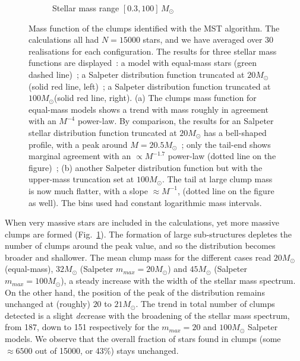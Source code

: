 \begin{figure}
\begin{subfigure}[b]{0.49\textwidth}
        \caption{Stellar mass range $[0.3, 100]\, M_\odot$}
        \label{Fig:2_ClumpMF_MF_2}
    \end{subfigure}
\caption{Mass function of the clumps identified with the MST algorithm. The calculations all had $N = 15 000$ stars, and we have averaged over 30 realisations for each configuration.  The results for three stellar mass functions  are displayed~: a model with equal-mass stars (green dashed line)~; a Salpeter distribution function truncated at $20 M_\odot$ (solid red line, left)~; a Salpeter distribution function truncated at $100 M_\odot$(solid red line, right). (a) The clumps  mass function for equal-mass models  shows a trend with mass roughly in agreement with an $M^{-4}$ power-law. By comparison,  the results for an  Salpeter stellar distribution function  truncated at $20 M_\odot$ has a bell-shaped profile, with a peak around $M = 20.5 M_{\odot}$~; only the tail-end shows marginal agreement with an $\propto M^{-1.7}$ power-law (dotted line on the figure)~; (b) another Salpeter distribution function but with  the upper-mass truncation  set at $100 M_\odot$. The tail at large clump mass is now much flatter, with a slope $\approx M^{-1}$, (dotted line on the figure as well). The bins used  had constant logarithmic mass intervals.}
\label{Fig:2_ClumpMF_MF}
\end{figure}



When very massive stars are included in the calculations, yet more massive clumps are formed (Fig.~\ref{Fig:2_ClumpMF_MF_2}). The formation of large sub-structures depletes the number of clumps around the peak value, and so the distribution becomes broader and shallower. The mean clump mass for the different cases read $20 M_\odot$ (equal-mass), $32 M_\odot$ (Salpeter $m_{max} = 20 M_\odot$) and $45 M_\odot$ (Salpeter $m_{max} = 100 M_\odot$), a steady increase with the width of the stellar mass spectrum. On the other hand, the position of the peak of the distribution remains unchanged at (roughly) $20$ to $21M_\odot$. The trend in total number of clumps detected is a slight {\it de}crease with the broadening of the  stellar mass spectrum, from 187, down to 151 respectively for the $m_{max}=20$ and $100 M_\odot$ Salpeter models.  
  We observe that the overall fraction of  stars found in clumps (some $\approx 6500$ out of 15000, or 43\%) stays unchanged.
  
